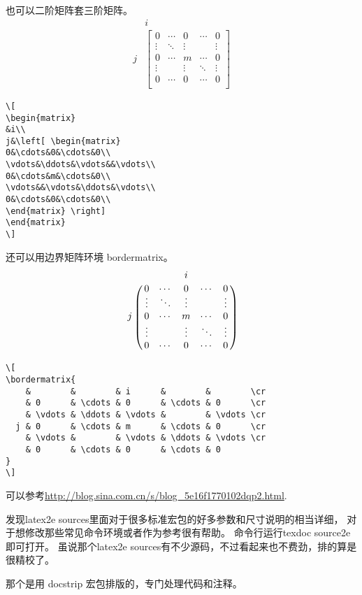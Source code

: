 \documentclass[QA.tex]{subfiles}
\begin{document}
也可以二阶矩阵套三阶矩阵。
\[
\begin{matrix}
&i\\
j&\left[ \begin{matrix}
0&\cdots&0&\cdots&0\\
\vdots&\ddots&\vdots&&\vdots\\
0&\cdots&m&\cdots&0\\
\vdots&&\vdots&\ddots&\vdots\\
0&\cdots&0&\cdots&0\\
\end{matrix} \right]
\end{matrix}
\]
\begin{verbatim}
\[
\begin{matrix}
&i\\
j&\left[ \begin{matrix}
0&\cdots&0&\cdots&0\\
\vdots&\ddots&\vdots&&\vdots\\
0&\cdots&m&\cdots&0\\
\vdots&&\vdots&\ddots&\vdots\\
0&\cdots&0&\cdots&0\\
\end{matrix} \right]
\end{matrix}
\]
\end{verbatim}

还可以用边界矩阵环境 bordermatrix。
\[
\bordermatrix{
	&	     &        & i      &		&        \cr
	& 0      & \cdots & 0      & \cdots & 0      \cr
	& \vdots & \ddots & \vdots &		& \vdots \cr
  j & 0      & \cdots & m      & \cdots & 0      \cr
	& \vdots &		  & \vdots & \ddots & \vdots \cr
	& 0      & \cdots & 0      & \cdots & 0
}
\]
\begin{verbatim}
\[
\bordermatrix{
	&	     &        & i      &		&        \cr
	& 0      & \cdots & 0      & \cdots & 0      \cr
	& \vdots & \ddots & \vdots &		& \vdots \cr
  j & 0      & \cdots & m      & \cdots & 0      \cr
	& \vdots &		  & \vdots & \ddots & \vdots \cr
	& 0      & \cdots & 0      & \cdots & 0
}
\]
\end{verbatim}

可以参考\url{http://blog.sina.com.cn/s/blog_5e16f1770102dqp2.html}.

\begin{qst}\label{Q2017110203}
发现latex2e sources里面对于很多标准宏包的好多参数和尺寸说明的相当详细，
 对于想修改那些常见命令环境或者作为参考很有帮助。
命令行运行texdoc source2e即可打开。
虽说那个latex2e sources有不少源码，不过看起来也不费劲，排的算是很精校了。

\end{qst}
\ans 那个是用 docstrip 宏包排版的，专门处理代码和注释。
\end{document}
